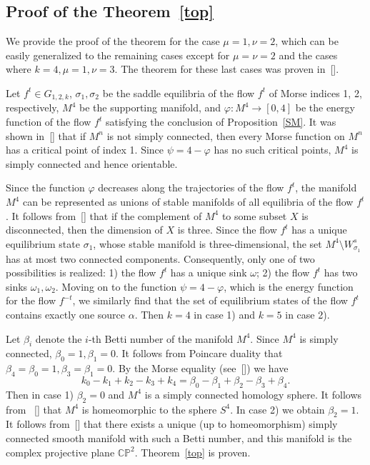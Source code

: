 \documentclass[%
 aip,
 amsmath,amssymb,
preprint,%
]{revtex4-1}
\begin{document}
\subsection{Proof of the Theorem~\ref{top}}

We provide the proof of the theorem for the case $\mu=1,\nu=2$, which can be easily generalized to the remaining cases except for $\mu=\nu=2$ and the cases where $k=4,\mu=1,\nu=3$. The theorem for these last cases was proven in~[]. 

Let $f^t\in G_{1, 2, k}$, $\sigma_1, \sigma_2$ be the saddle equilibria of the flow $f^t$ of Morse indices 1, 2, respectively, $M^4$ be the supporting manifold, and $\varphi: M^4\to [0,4]$ be the energy function of the flow $f^t$ satisfying the conclusion of Proposition~\ref{SM}. It was shown in~[] that if $M^n$ is not simply connected, then every Morse function on $M^n$ has a critical point of index 1. Since $\psi=4-\varphi$ has no such critical points, $M^4$ is simply connected and hence orientable.

Since the function $\varphi$ decreases along the trajectories of the flow $f^t$, the manifold $M^4$ can be represented as unions of stable manifolds of all equilibria of the flow $f^t$. It follows from~[] that if the complement of $M^4$ to some subset $X$ is disconnected, then the dimension of $X$ is three. Since the flow $f^t$ has a unique equilibrium state $\sigma_1$, whose stable manifold is three-dimensional, the set $M^4\setminus W^s_{\sigma_1}$ has at most two connected components. Consequently, only one of two possibilities is realized: 1) the flow $f^t$ has a unique sink $\omega$; 2) the flow $f^t$ has two sinks $\omega_1, \omega_2$. Moving on to the function $\psi=4-\varphi$, which is the energy function for the flow $f^{-t}$, we similarly find that the set of equilibrium states of the flow $f^t$ contains exactly one source $\alpha$. Then $k=4$ in case 1) and $k=5$ in case 2).

Let $\beta_i$ denote the $i$-th Betti number of the manifold $M^4$. Since $M^4$ is simply connected, $\beta_0=1, \beta_1=0$. It follows from Poincare duality  that $\beta_4=\beta_0=1, \beta_3=\beta_1=0$. By the Morse equality (see~[]) we have $$k_0-k_1+k_2-k_3+k_4=\beta_0-\beta_1+\beta_2-\beta_3+\beta_4.$$ Then in case 1) $\beta_2=0$ and $M^4$ is a simply connected homology sphere. It follows from ~[] that $M^4$ is homeomorphic to the sphere $S^4$. In case 2) we obtain $\beta_2=1$. It follows from~[] that there exists a unique (up to homeomorphism) simply connected smooth manifold with such a Betti number, and this manifold is the complex projective plane $\mathbb{CP}^2$. Theorem~\ref{top} is proven.
\end{document}
